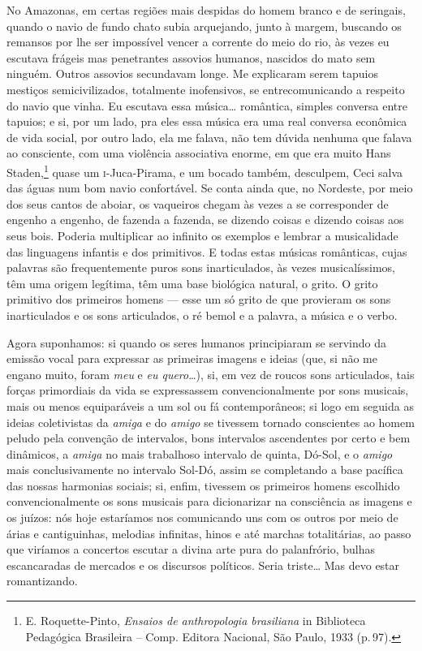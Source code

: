 No Amazonas, em certas regiões mais despidas do homem branco e de
seringais, quando o navio de fundo chato subia arquejando, junto à
margem, buscando os remansos por lhe ser impossível vencer a corrente do
meio do rio, às vezes eu escutava frágeis mas penetrantes assovios
humanos, nascidos do mato sem ninguém. Outros assovios secundavam longe.
Me explicaram serem tapuios mestiços semicivilizados, totalmente
inofensivos, se entrecomunicando a respeito do navio que vinha. Eu
escutava essa música\ldots{} romântica, simples conversa entre tapuios; e si,
por um lado, pra eles essa música era uma real conversa econômica de
vida social, por outro lado, ela me falava, não tem dúvida nenhuma que
falava ao consciente, com uma violência associativa enorme, em que era
muito Hans Staden,\footnote{E. Roquette-Pinto, \emph{Ensaios de anthropologia brasiliana} in Biblioteca Pedagógica Brasileira -- Comp. Editora Nacional, São Paulo, 1933 (p.\,97).} quase um \textsc{i}-Juca-Pirama, e um bocado também,
desculpem, Ceci salva das águas num bom navio confortável. Se conta
ainda que, no Nordeste, por meio dos seus cantos de aboiar, os vaqueiros
chegam às vezes a se corresponder de engenho a engenho, de fazenda a
fazenda, se dizendo coisas e dizendo coisas aos seus bois. Poderia
multiplicar ao infinito os exemplos e lembrar a musicalidade das
linguagens infantis e dos primitivos. E todas estas músicas românticas,
cujas palavras são frequentemente puros sons inarticulados, às vezes
musicalíssimos, têm uma origem legítima, têm uma base biológica natural,
o grito. O grito primitivo dos primeiros homens --- esse um só grito de
que provieram os sons inarticulados e os sons articulados, o ré bemol e
a palavra, a música e o verbo.

Agora suponhamos: si quando os seres humanos principiaram se servindo da
emissão vocal para expressar as primeiras imagens e ideias (que, si não
me engano muito, foram \textit{meu} e \textit{eu quero}\ldots{}), si, em vez de roucos
sons articulados, tais forças primordiais da vida se expressassem
convencionalmente por sons musicais, mais ou menos equiparáveis a um sol
ou fá contemporâneos; si logo em seguida as ideias coletivistas da
\textit{amiga} e do \textit{amigo} se tivessem tornado conscientes ao homem peludo
pela convenção de intervalos, bons intervalos ascendentes por certo e
bem dinâmicos, a \textit{amiga} no mais trabalhoso intervalo de quinta,
Dó-Sol, e o \textit{amigo} mais conclusivamente no intervalo Sol-Dó, assim se
completando a base pacífica das nossas harmonias sociais; si, enfim,
tivessem os primeiros homens escolhido convencionalmente os sons
musicais para dicionarizar na consciência as imagens e os juízos: nós
hoje estaríamos nos comunicando uns com os outros por meio de árias e
cantiguinhas, melodias infinitas, hinos e até marchas totalitárias, ao
passo que viríamos a concertos escutar a divina arte pura do
palanfrório, bulhas escancaradas de mercados e os discursos políticos.
Seria triste\ldots{} Mas devo estar romantizando.

